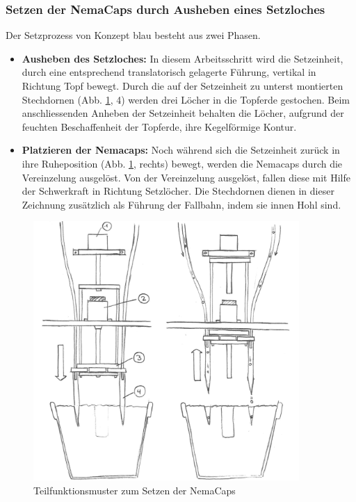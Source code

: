 \subsubsection{Setzen der NemaCaps durch Ausheben eines Setzloches}
Der Setzprozess von Konzept blau besteht aus zwei Phasen.

\begin{itemize}
	\item \textbf{Ausheben des Setzloches:} In diesem Arbeitsschritt wird die Setzeinheit, durch eine entsprechend translatorisch gelagerte Führung, vertikal in Richtung Topf bewegt. Durch die auf der Setzeinheit zu unterst montierten Stechdornen (Abb. \ref{fig:blau_setzeinheit}, 4) werden drei Löcher in die Topferde gestochen. Beim anschliessenden Anheben der Setzeinheit behalten die Löcher, aufgrund der feuchten Beschaffenheit der Topferde, ihre Kegelförmige Kontur.
\newpage	
	\item \textbf{Platzieren der Nemacaps:} Noch während sich die Setzeinheit zurück in ihre Ruheposition (Abb. \ref{fig:blau_setzeinheit}, rechts) bewegt, werden die Nemacaps durch die Vereinzelung ausgelöst. Von der Vereinzelung ausgelöst, fallen diese mit Hilfe der Schwerkraft in Richtung Setzlöcher. Die Stechdornen dienen in dieser Zeichnung zusätzlich als Führung der Fallbahn, indem sie innen Hohl sind.
\end{itemize}

\begin{figure}[H]
	\includegraphics[draft=false,width=0.9\textwidth]{Illustrationen/5-Konzept/blau_Setzeinheit_ohneLegende.jpg}
	\caption{Teilfunktionsmuster zum Setzen der NemaCaps}
	\label{fig:blau_setzeinheit}
\end{figure}

